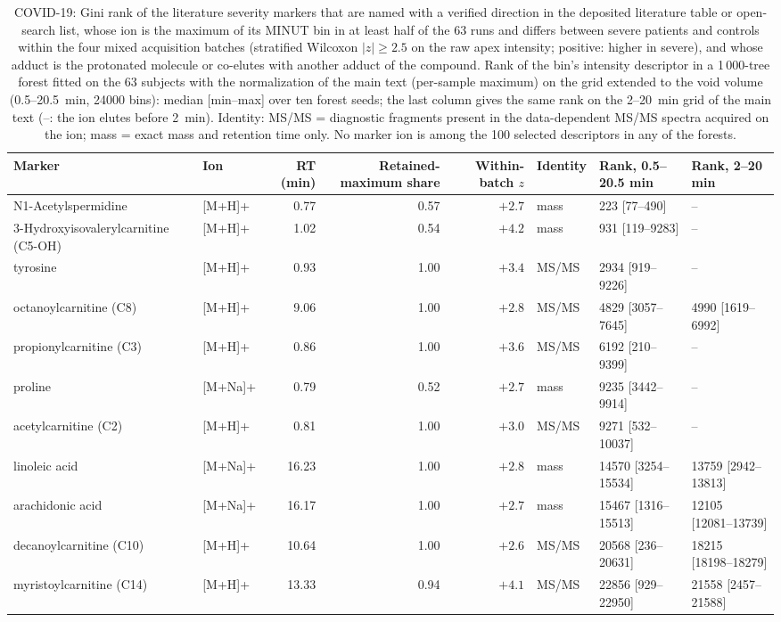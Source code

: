 \begin{table}[H]\centering\small
{}
\caption{COVID-19: Gini rank of the literature severity markers that are named with a verified direction in the deposited literature table or open-search list, whose ion is the maximum of its MINUT bin in at least half of the 63 runs and differs between severe patients and controls within the four mixed acquisition batches (stratified Wilcoxon $|z| \geq 2.5$ on the raw apex intensity; positive: higher in severe), and whose adduct is the protonated molecule or co-elutes with another adduct of the compound. Rank of the bin's intensity descriptor in a 1\,000-tree forest fitted on the 63 subjects with the normalization of the main text (per-sample maximum) on the grid extended to the void volume (0.5--20.5~min, 24000 bins): median [min--max] over ten forest seeds; the last column gives the same rank on the 2--20~min grid of the main text (--: the ion elutes before 2~min). Identity: MS/MS = diagnostic fragments present in the data-dependent MS/MS spectra acquired on the ion; mass = exact mass and retention time only. No marker ion is among the 100 selected descriptors in any of the forests.}
\label{si:tab:covid_batch_markers}
\begin{adjustbox}{max width=\textwidth}
\begin{tabular}{@{}llrrrlll@{}}\toprule
Marker & Ion & RT (min) & Retained-maximum share & Within-batch $z$ & Identity & Rank, 0.5--20.5 min & Rank, 2--20 min \\\midrule
N1-Acetylspermidine & [M+H]+ & 0.77 & 0.57 & $+2.7$ & mass & 223 [77--490] & -- \\
3-Hydroxyisovalerylcarnitine (C5-OH) & [M+H]+ & 1.02 & 0.54 & $+4.2$ & mass & 931 [119--9283] & -- \\
tyrosine & [M+H]+ & 0.93 & 1.00 & $+3.4$ & MS/MS & 2934 [919--9226] & -- \\
octanoylcarnitine (C8) & [M+H]+ & 9.06 & 1.00 & $+2.8$ & MS/MS & 4829 [3057--7645] & 4990 [1619--6992] \\
propionylcarnitine (C3) & [M+H]+ & 0.86 & 1.00 & $+3.6$ & MS/MS & 6192 [210--9399] & -- \\
proline & [M+Na]+ & 0.79 & 0.52 & $+2.7$ & mass & 9235 [3442--9914] & -- \\
acetylcarnitine (C2) & [M+H]+ & 0.81 & 1.00 & $+3.0$ & MS/MS & 9271 [532--10037] & -- \\
linoleic acid & [M+Na]+ & 16.23 & 1.00 & $+2.8$ & mass & 14570 [3254--15534] & 13759 [2942--13813] \\
arachidonic acid & [M+Na]+ & 16.17 & 1.00 & $+2.7$ & mass & 15467 [1316--15513] & 12105 [12081--13739] \\
decanoylcarnitine (C10) & [M+H]+ & 10.64 & 1.00 & $+2.6$ & MS/MS & 20568 [236--20631] & 18215 [18198--18279] \\
myristoylcarnitine (C14) & [M+H]+ & 13.33 & 0.94 & $+4.1$ & MS/MS & 22856 [929--22950] & 21558 [2457--21588] \\
\bottomrule\end{tabular}
\end{adjustbox}
\end{table}
